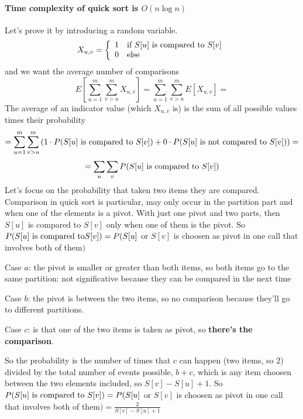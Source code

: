 \documentclass[10pt]{report}
\begin{document}
\paragraph{Time complexity of quick sort is $O(n\log n)$} Let's prove it by introducing a random variable. $$X_{u,v} = \left\{\begin{array}{c l}
1&\hbox{if }S[u]\hbox{ is compared to }S[v]\\0&\hbox{else}
\end{array}\right.$$ and we want the average number of comparisons $$E\left[\sum_{u=1}^m\sum_{v>u}^m X_{u,v}\right] = \sum_{u=1}^m\sum_{v>u}^m E\left[X_{u,v}\right] = $$
The average of an indicator value (which $X_{u,v}$ is) is the sum of all possible values times their probability $$= \sum_{u=1}^m\sum_{v>u}^m \left(1\cdot P(S[u]\hbox{ is compared to }S[v]) + 0\cdot P(S[u]\hbox{ is not compared to }S[v])\right) = $$
$$=\sum_u \sum_v P(S[u]\hbox{ is compared to }S[v])$$
Let's focus on the probability that taken two items they are compared. Comparison in quick sort is particular, may only occur in the partition part and when one of the elements is a pivot. With just one pivot and two parts, then $S[u]$ is compared to $S[v]$ only when one of them is the pivot. So $P(S[u]\hbox{ is compared to}S[v]) = P(S[u]$ or $S[v]$ is choosen as pivot in one call that involves both of them$)$
\begin{list}{}{}
	\item Case $a$: the pivot is smaller or greater than both items, so both items go to the same partition: not significative because they can be compared in the next time 
	\item Case $b$: the pivot is between the two items, so no comparison because they'll go to different partitions.
	\item Case $c$: is that one of the two items is taken as pivot, so \textbf{there's the comparison}.
\end{list}
So the probability is the number of times that $c$ can happen (two items, so $2$) divided by the total number of events possible, $b + c$, which is any item choosen between the two elements included, so $S[v] - S[u] + 1$. So $P(S[u]\hbox{ is compared to }S[v]) = P(S[u]$ or $S[v]$ is choosen as pivot in one call that involves both of them$) = \frac{2}{S[v] - S[u] + 1}$\\
\end{document}
